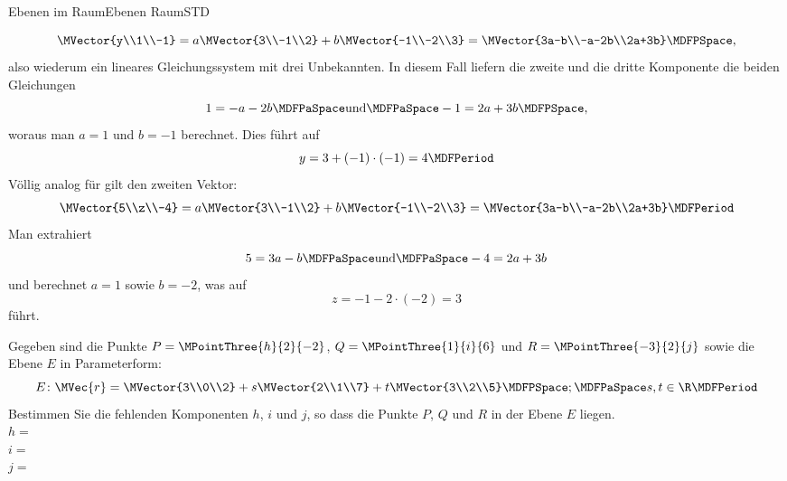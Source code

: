 \begin{MXContent}{Ebenen im Raum}{Ebenen Raum}{STD}
\begin{MExercise}
\begin{MHint}{\iSolution}
\[
 \MVector{y\\1\\-1}=a\MVector{3\\-1\\2}+b\MVector{-1\\-2\\3}=\MVector{3a-b\\-a-2b\\2a+3b} \MDFPSpace,
\]
also wiederum ein lineares Gleichungssystem mit drei Unbekannten. In diesem Fall liefern die zweite und die dritte Komponente die beiden Gleichungen
\[
 1=-a-2b\MDFPaSpace\textrm{und}\MDFPaSpace -1=2a+3b \MDFPSpace,
\]
woraus man $a=1$ und $b=-1$ berechnet. Dies führt auf
\[
 y= 3+ (-1)\cdot(-1)=4 \MDFPeriod
\]
Völlig analog für gilt den zweiten Vektor:
\[
 \MVector{5\\z\\-4}=a\MVector{3\\-1\\2}+b\MVector{-1\\-2\\3}=\MVector{3a-b\\-a-2b\\2a+3b}\MDFPeriod
\]
Man extrahiert
\[
 5=3a-b\MDFPaSpace\textrm{und}\MDFPaSpace -4=2a+3b
\]
und berechnet $a=1$ sowie $b=-2$, was auf 
\[
 z=-1-2\cdot(-2)=3
\]
führt.
\end{MHint}

\end{MExercise}


\begin{MExercise}
Gegeben sind die Punkte $P=\MPointThree{h}{2}{-2}$, $Q=\MPointThree{1}{i}{6}$ und $R=\MPointThree{-3}{2}{j}$ sowie die Ebene $E$ in Parameterform:
\[
 E\colon\MVec{r}=\MVector{3\\0\\2}+s\MVector{2\\1\\7}+t\MVector{3\\2\\5}\MDFPSpace;\MDFPaSpace s,t\in\R\MDFPeriod
\]
Bestimmen Sie die fehlenden Komponenten $h$, $i$ und $j$, so dass die Punkte $P$, $Q$ und $R$ in der Ebene $E$ liegen.\\
$h=$\\
$i=$\\
$j=$\\


\end{MExercise}
\end{MXContent}
